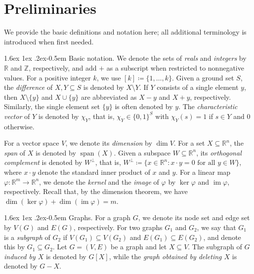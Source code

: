 \documentclass{article}
\makeatletter
\renewcommand{\paragraph}{%
  \@startsection{paragraph}{4}%
  {\z@}{1.6ex \@plus 1ex \@minus .2ex}{-0.5em}%
  {\normalfont\normalsize\bfseries}%
}
\theoremstyle{plain}
\theoremstyle{definition}
\DeclareMathOperator\im{im}
\DeclareMathOperator\spa{span}
\newcommand{\bR}{\mathbb{R}}
\newcommand{\bZ}{\mathbb{Z}}
\makeatother
\begin{document}
\section{Preliminaries}
\label{sec:preliminaries}

We provide the basic definitions and notation here; all additional terminology is introduced when first needed.

\paragraph{Basic notation.} We denote the sets of \emph{reals} and \emph{integers} by $\bR$ and $\bZ$, respectively, and add $+$ as a subscript when restricted to nonnegative values. For a positive integer $k$, we use $[k]\coloneqq\{1,\dots,k\}$. Given a ground set $S$, the \emph{difference} of $X,Y\subseteq S$ is denoted by $X\setminus Y$. If $Y$ consists of a single element $y$, then $X\setminus \{y\}$ and $X\cup \{y\}$ are abbreviated as $X-y$ and $X+y$, respectively. Similarly, the single element set $\{y\}$ is often denoted by $y$. The \emph{characteristic vector} of $Y$ is denoted by $\chi_Y$, that is, $\chi_Y\in\{0,1\}^S$ with $\chi_Y(s)=1$ if $s\in Y$ and $0$ otherwise.  

For a vector space $V$, we denote its \emph{dimension} by $\dim V$. For a set $X\subseteq \bR^n$, the \emph{span} of $X$ is denoted by $\spa(X)$. Given a subspace $W\subseteq \bR^n$, its \emph{orthogonal complement} is denoted by $W^\perp$, that is, $W^\perp \coloneqq \{x\in \bR^n \colon x\cdot y = 0 \text{ for all } y\in W\}$, where $x \cdot y$ denote the standard inner product of $x$ and $y$. For a linear map $\varphi\colon\bR^m\to\bR^n$, we denote the \emph{kernel} and the \emph{image} of $\varphi$ by $\ker\varphi$ and $\im\varphi$, respectively. Recall that, by the dimension theorem, we have $\dim (\ker \varphi) + \dim (\im \varphi) = m$.

\paragraph{Graphs.} For a graph $G$, we denote its node set and edge set by $V(G)$ and $E(G)$, respectively. For two graphs $G_1$ and $G_2$, we say that $G_1$ is a \emph{subgraph} of $G_2$ if $V(G_1)\subseteq V(G_2)$ and $E(G_1)\subseteq E(G_2)$, and denote this by $G_1\subseteq G_2$. Let $G=(V,E)$ be a graph and let $X\subseteq V$. The subgraph of $G$ \emph{induced by $X$} is denoted by $G[X]$, while the \emph{graph obtained by deleting $X$} is denoted by $G-X$. 
\end{document}
